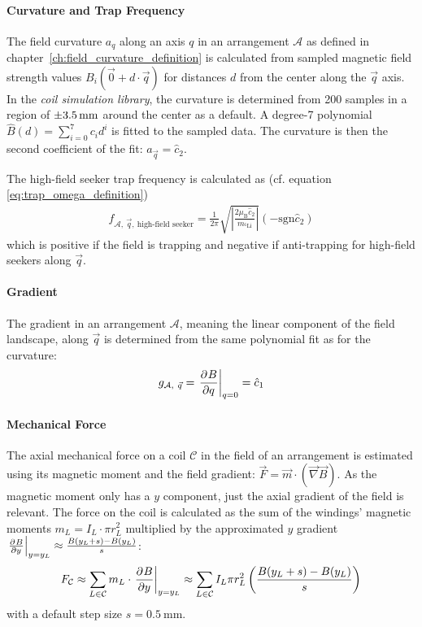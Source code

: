 \paragraph{Curvature and Trap Frequency}
The field curvature $a_q$ along an axis $q$ in an arrangement $\mathcal{A}$ as defined in chapter~\ref{ch:field_curvature_definition} is calculated from sampled magnetic field strength values $B_i(\vec 0 + d \cdot \vec q)$ for distances $d$ from the center along the $\vec q$ axis. In the \textit{coil simulation library}, the curvature is determined from \SI{200}{} samples in a region of $\SI{+-3.5}{\milli\meter}$ around the center as a default. A degree-7 polynomial ${\hat B(d) = \sum_{i=0}^7 c_i d^i}$ is fitted to the sampled data. The curvature is then the second coefficient of the fit: $a_{\vec q} = \hat c_2$.

The high-field seeker trap frequency is calculated as (cf. equation \ref{eq:trap_omega_definition})
\begin{align}\label{eq:trap_frequency_simulation}
    f_{\mathcal{A},~\vec q,~\text{high-field seeker}} = \frac{1}{2\pi}  \sqrt{\left| \frac{2 \mu_\text{B} \hat c_2 }{m_{^6\text{Li}}} \right|} (-\mathrm{sgn} \hat c_2)
\end{align}
which is positive if the field is trapping and negative if anti-trapping for high-field seekers along $\vec q$.

\paragraph{Gradient}
The gradient in an arrangement $\mathcal{A}$, meaning the linear component of the field landscape, along $\vec q$ is determined from the same polynomial fit as for the curvature:
\begin{align}\label{eq:gradient_simulation}
    g_{\mathcal{A},~\vec q} = \eval{\pdv[]{B}{q}}_{q = 0} = \hat c_1
\end{align}

\paragraph{Mechanical Force}
The axial mechanical force on a coil $\mathcal{C}$ in the field of an arrangement is estimated using its magnetic moment and the field gradient: $\vec F = \vec m \cdot (\vec \nabla \vec B)$. As the magnetic moment only has a $y$ component, just the axial gradient of the field is relevant. The force on the coil is calculated as the sum of the windings' magnetic moments $m_L = I_L \cdot \pi r_L^2$ multiplied by the approximated $y$ gradient $\eval{\pdv[]{B}{y}}_{y = y_L} \approx \frac{B(y_L + s) - B(y_L)}{s}$:
\begin{align}\label{eq:mechanical_force_simulation}
    F_\mathcal{C} \approx \sum\limits_{L \in \mathcal{C}} m_L \cdot \eval{\pdv[]{B}{y}}_{y = y_L} \approx \sum\limits_{L \in \mathcal{C}} I_L \pi r_L^2 \left(\frac{B(y_L + s)-B(y_L)}{s}\right)
\end{align}
with a default step size $s = \SI{0.5}{\milli\meter}$.

